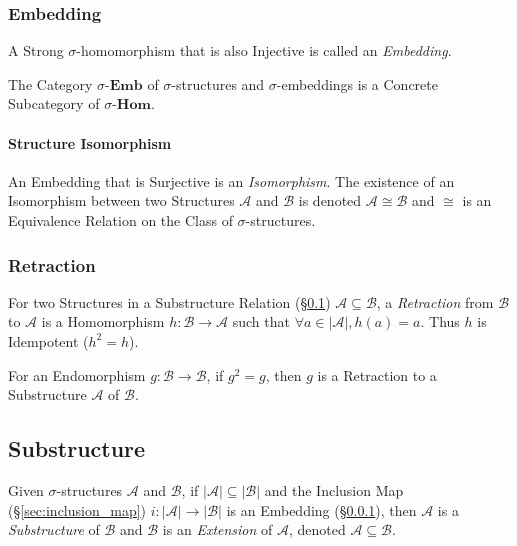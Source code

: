 \subsubsection{Embedding}\label{sec:embedding}

A Strong $\sigma$-homomorphism that is also Injective is called an
\emph{Embedding}.

The Category $\sigma$-$\mathbf{Emb}$ of $\sigma$-structures and
$\sigma$-embeddings is a Concrete Subcategory of
$\sigma$-$\mathbf{Hom}$.



\paragraph{Structure Isomorphism}\label{sec:structure_isomorphism}

An Embedding that is Surjective is an \emph{Isomorphism}. The
existence of an Isomorphism between two Structures $\mathcal{A}$ and
$\mathcal{B}$ is denoted $\mathcal{A} \cong \mathcal{B}$ and $\cong$
is an Equivalence Relation on the Class of $\sigma$-structures.



\subsubsection{Retraction}\label{sec:retraction}

For two Structures in a Substructure Relation
(\S\ref{sec:substructure}) $\mathcal{A} \subseteq \mathcal{B}$, a
\emph{Retraction} from $\mathcal{B}$ to $\mathcal{A}$ is a
Homomorphism $h : \mathcal{B} \rightarrow \mathcal{A}$ such that
$\forall a \in |\mathcal{A}|, h(a) = a$. Thus $h$ is Idempotent ($h^2
= h$).

For an Endomorphism $g : \mathcal{B} \rightarrow \mathcal{B}$, if $g^2
= g$, then $g$ is a Retraction to a Substructure $\mathcal{A}$ of
$\mathcal{B}$.



\subsection{Substructure}\label{sec:substructure}

Given $\sigma$-structures $\mathcal{A}$ and $\mathcal{B}$, if
$|\mathcal{A}| \subseteq |\mathcal{B}|$ and the Inclusion Map
(\S\ref{sec:inclusion_map}) $i : |\mathcal{A}| \rightarrow
|\mathcal{B}|$ is an Embedding (\S\ref{sec:embedding}), then
$\mathcal{A}$ is a \emph{Substructure} of $\mathcal{B}$ and
$\mathcal{B}$ is an \emph{Extension} of $\mathcal{A}$, denoted
$\mathcal{A} \subseteq \mathcal{B}$.

